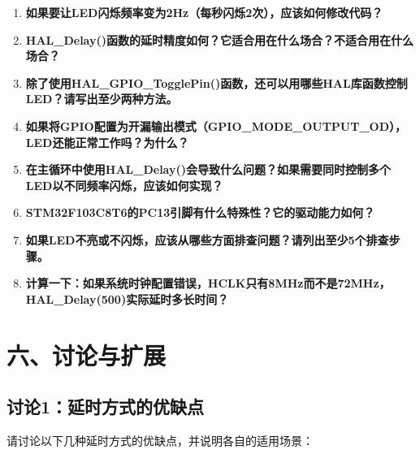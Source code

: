 \documentclass[
  chinese,
  UTF8,
  oneside,
  openany]{ctexbook}
\begin{document}
\begin{enumerate}
\def\labelenumi{\arabic{enumi}.}
\item
  \textbf{如果要让LED闪烁频率变为2Hz（每秒闪烁2次），应该如何修改代码？}
\item
  \textbf{HAL\_Delay()函数的延时精度如何？它适合用在什么场合？不适合用在什么场合？}
\item
  \textbf{除了使用HAL\_GPIO\_TogglePin()函数，还可以用哪些HAL库函数控制LED？请写出至少两种方法。}
\item
  \textbf{如果将GPIO配置为开漏输出模式（GPIO\_MODE\_OUTPUT\_OD），LED还能正常工作吗？为什么？}
\item
  \textbf{在主循环中使用HAL\_Delay()会导致什么问题？如果需要同时控制多个LED以不同频率闪烁，应该如何实现？}
\item
  \textbf{STM32F103C8T6的PC13引脚有什么特殊性？它的驱动能力如何？}
\item
  \textbf{如果LED不亮或不闪烁，应该从哪些方面排查问题？请列出至少5个排查步骤。}
\item
  \textbf{计算一下：如果系统时钟配置错误，HCLK只有8MHz而不是72MHz，HAL\_Delay(500)实际延时多长时间？}
\end{enumerate}

\section{六、讨论与扩展}\label{ux516dux8ba8ux8bbaux4e0eux6269ux5c55}

\subsection{讨论1：延时方式的优缺点}\label{ux8ba8ux8bba1ux5ef6ux65f6ux65b9ux5f0fux7684ux4f18ux7f3aux70b9}

请讨论以下几种延时方式的优缺点，并说明各自的适用场景：
\end{document}
